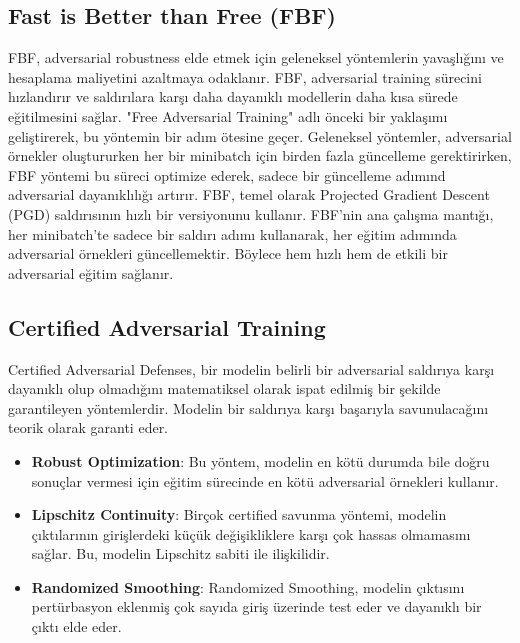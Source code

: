 \newpage

\subsection{Fast is Better than Free (FBF)}

FBF, adversarial robustness elde etmek için geleneksel yöntemlerin yavaşlığını ve hesaplama maliyetini azaltmaya odaklanır. FBF, adversarial training sürecini hızlandırır ve saldırılara karşı daha dayanıklı modellerin daha kısa sürede eğitilmesini sağlar. "Free Adversarial Training" adlı önceki bir yaklaşımı geliştirerek, bu yöntemin bir adım ötesine geçer. Geleneksel yöntemler, adversarial örnekler oluştururken her bir minibatch için birden fazla güncelleme gerektirirken, FBF yöntemi bu süreci optimize ederek, sadece bir güncelleme adımınd adversarial dayanıklılığı artırır. FBF, temel olarak Projected Gradient Descent (PGD) saldırısının hızlı bir versiyonunu kullanır. FBF'nin ana çalışma mantığı, her minibatch'te sadece bir saldırı adımı kullanarak, her eğitim adımında adversarial örnekleri güncellemektir. Böylece hem hızlı hem de etkili bir adversarial eğitim sağlanır.

\newpage

\subsection{Certified Adversarial Training}

Certified Adversarial Defenses, bir modelin belirli bir adversarial saldırıya karşı dayanıklı olup olmadığını matematiksel olarak ispat edilmiş bir şekilde garantileyen yöntemlerdir. Modelin bir saldırıya karşı başarıyla savunulacağını teorik olarak garanti eder. 

\begin{itemize}
    \item \textbf{Robust Optimization}: Bu yöntem, modelin en kötü durumda bile doğru sonuçlar vermesi için eğitim sürecinde en kötü adversarial örnekleri kullanır.
    \item \textbf{Lipschitz Continuity}: Birçok certified savunma yöntemi, modelin çıktılarının girişlerdeki küçük değişikliklere karşı çok hassas olmamasını sağlar. Bu, modelin Lipschitz sabiti ile ilişkilidir.
    \item \textbf{Randomized Smoothing}: Randomized Smoothing, modelin çıktısını pertürbasyon eklenmiş çok sayıda giriş üzerinde test eder ve dayanıklı bir çıktı elde eder.
\end{itemize}

